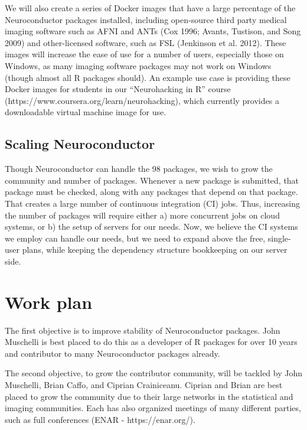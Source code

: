 \documentclass[]{elsarticle} %
\begin{document}
We will also create a series of Docker images that have a large percentage of the Neuroconductor packages installed, including open-source third party medical imaging software such as AFNI and ANTs (Cox 1996; Avants, Tustison, and Song 2009) and other-licensed software, such as FSL (Jenkinson et al. 2012). These images will increase the ease of use for a number of users, especially those on Windows, as many imaging software packages may not work on Windows (though almost all R packages should). An example use case is providing these Docker images for students in our ``Neurohacking in R'' course (https://www.coursera.org/learn/neurohacking), which currently provides a downloadable virtual machine image for use.

\hypertarget{scaling-neuroconductor}{%
\subsection{Scaling Neuroconductor}\label{scaling-neuroconductor}}

Though Neuroconductor can handle the 98 packages, we wish to grow the community and number of packages. Whenever a new package is submitted, that package must be checked, along with any packages that depend on that package. That creates a large number of continuous integration (CI) jobs. Thus, increasing the number of packages will require either a) more concurrent jobs on cloud systems, or b) the setup of servers for our needs. Now, we believe the CI systems we employ can handle our needs, but we need to expand above the free, single-user plans, while keeping the dependency structure bookkeeping on our server side.

\hypertarget{work-plan}{%
\section{Work plan}\label{work-plan}}

The first objective is to improve stability of Neuroconductor packages. John Muschelli is best placed to do this as a developer of R packages for over 10 years and contributor to many Neuroconductor packages already.

The second objective, to grow the contributor community, will be tackled by
John Muschelli, Brian Caffo, and Ciprian Crainiceanu. Ciprian and Brian are best placed to grow the community due to their large networks in the statistical and imaging communities. Each has also organized meetings of many different parties, such as full conferences (ENAR - https://enar.org/).
\end{document}
